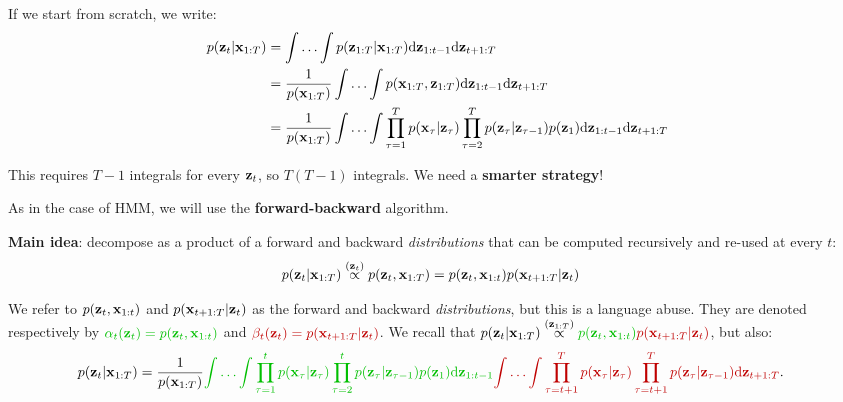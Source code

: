 If we start from scratch, we write:
\begin{align}
 p(\boldsymbol{\mathbf{z}}_{t}|\boldsymbol{\mathbf{x}}_{1:T}) &= \int\ldots\int p(\boldsymbol{\mathbf{z}}_{1:T}|\boldsymbol{\mathbf{x}}_{1:T}) \textrm{d}\boldsymbol{\mathbf{z}}_{1:t-1}\textrm{d}\boldsymbol{\mathbf{z}}_{t+1:T} \\
 &= \frac{1}{p(\boldsymbol{\mathbf{x}}_{1:T})}\int\ldots\int p(\boldsymbol{\mathbf{x}}_{1:T},\boldsymbol{\mathbf{z}}_{1:T}) \textrm{d}\boldsymbol{\mathbf{z}}_{1:t-1}\textrm{d}\boldsymbol{\mathbf{z}}_{t+1:T} \\
 &= \frac{1}{p(\boldsymbol{\mathbf{x}}_{1:T})}\int\ldots\int \prod_{\tau=1}^{T} p(\boldsymbol{\mathbf{x}}_{\tau}|\boldsymbol{\mathbf{z}}_{\tau}) \prod_{\tau=2}^{T} p(\boldsymbol{\mathbf{z}}_{\tau}|\boldsymbol{\mathbf{z}}_{\tau-1})p(\boldsymbol{\mathbf{z}}_1) \textrm{d}\boldsymbol{\mathbf{z}}_{1:t-1}\textrm{d}\boldsymbol{\mathbf{z}}_{t+1:T}
\end{align}

This requires $T-1$ integrals for every $\boldsymbol{\mathbf{z}}_t$, so $T(T-1)$ integrals. We need a \textbf{smarter strategy}! 

As in the case of HMM, we will use the \textbf{forward-backward} algorithm.\vspace{3mm}
 
\textbf{Main idea}: decompose as a product of a forward and backward \textit{distributions} that can be computed recursively and re-used at every $t$:
\begin{align}
p(\boldsymbol{\mathbf{z}}_t|\boldsymbol{\mathbf{x}}_{1:T}) &\stackrel{(\boldsymbol{\mathbf{z}}_t)}{\propto} p(\boldsymbol{\mathbf{z}}_t,\boldsymbol{\mathbf{x}}_{1:T}) = p(\boldsymbol{\mathbf{z}}_t,\boldsymbol{\mathbf{x}}_{1:t}) p(\boldsymbol{\mathbf{x}}_{t+1:T}|\boldsymbol{\mathbf{z}}_t)
\end{align}\vspace{3mm}

\vspace{3mm}
 
 
We refer to $p(\boldsymbol{\mathbf{z}}_t,\boldsymbol{\mathbf{x}}_{1:t})$ and $p(\boldsymbol{\mathbf{x}}_{t+1:T}|\boldsymbol{\mathbf{z}}_t)$ as the forward and backward \textit{distributions}, but this is a language abuse. They are denoted respectively by $\paint{mygreen}{\alpha_t(\bs{z}_t)=p(\bs{z}_t,\bs{x}_{1:t})}$ and $\paint{myred}{\beta_t(\bs{z}_t)=p(\bs{x}_{t+1:T}|\bs{z}_t)}$. We recall that $p(\bs{z}_t|\bs{x}_{1:T}) \stackrel{(\bs{z}_{1:T})}{\propto} \paint{mygreen}{p(\bs{z}_t,\bs{x}_{1:t})} \paint{myred}{p(\bs{x}_{t+1:T}|\bs{z}_t)}$, but also:
\begin{align}
 p(\bs{z}_{t}|\bs{x}_{1:T}) &= \frac{1}{p(\bs{x}_{1:T})}\paint{mygreen}{\int\ldots\int \prod_{\tau=1}^{t} p(\bs{x}_{\tau}|\bs{z}_{\tau}) \prod_{\tau=2}^{t} p(\bs{z}_{\tau}|\bs{z}_{\tau-1})p(\bs{z}_1) \textrm{d}\bs{z}_{1:t-1}}  \paint{myred}{\int\ldots\int \prod_{\tau=t+1}^{T} p(\bs{x}_{\tau}|\bs{z}_{\tau}) \prod_{\tau=t+1}^{T} p(\bs{z}_{\tau}|\bs{z}_{\tau-1}) \textrm{d}\bs{z}_{t+1:T}}.
\end{align}


